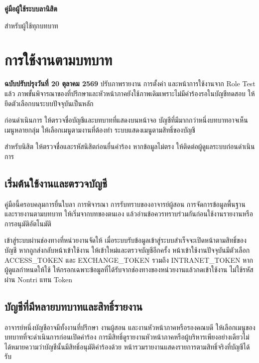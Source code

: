\documentclass[17pt,a4paper]{extreport}
\begin{document}
\begin{titlepage}
  \centering\vspace*{3cm}
  {\Huge\bfseries คู่มือผู้ใช้ระบบลานิสิต\par}
  \vspace{0.8cm}{\Large คณะวิศวกรรมศาสตร์ มหาวิทยาลัยเกษตรศาสตร์\par}
  \vspace{0.4cm}{\large KUKPS Engineering Leave Request\par}
  \vfill{\large สำหรับผู้ใช้ทุกบทบาท\par}\vspace{2cm}
\end{titlepage}
{\small\tableofcontents}\clearpage
\chapter{การใช้งานตามบทบาท}
\textbf{ฉบับปรับปรุงวันที่ 20 ตุลาคม 2569} ปรับภาพรายงาน การตั้งค่า และหน้าการใช้งานจาก Role Test แล้ว ภาพขั้นพิจารณาของที่ปรึกษาและหัวหน้าภาคยังใช้ภาพเดิมเพราะไม่มีคำร้องรอในบัญชีทดสอบ ให้ยึดตัวเลือกบนระบบปัจจุบันเป็นหลัก


ก่อนดำเนินการ ให้ตรวจชื่อบัญชีและบทบาทที่แสดงบนหน้าจอ บัญชีที่มีมากกว่าหนึ่งบทบาทอาจเห็นเมนูหลายกลุ่ม ให้เลือกเมนูตามงานที่ต้องทำ ระบบแสดงเมนูตามสิทธิ์ของบัญชี

สำหรับนิสิต ให้ตรวจชื่อและรหัสนิสิตก่อนยื่นคำร้อง หากข้อมูลไม่ตรง ให้ติดต่อผู้ดูแลระบบก่อนดำเนินการ


\section{เริ่มต้นใช้งานและตรวจบัญชี}
คู่มือนี้ครอบคลุมการยื่นใบลา การพิจารณา การรับทราบของอาจารย์ผู้สอน การจัดการข้อมูลพื้นฐาน และรายงานตามบทบาท ให้เริ่มจากบทของตนเอง แล้วอ่านข้อควรทราบร่วมกันก่อนใช้งานรายงานหรือการอนุมัติอัตโนมัติ

เข้าสู่ระบบผ่านช่องทางที่หน่วยงานจัดให้ เมื่อระบบรับข้อมูลเข้าสู่ระบบสำเร็จจะเปิดหน้าตามสิทธิ์ของบัญชี หากถูกส่งกลับหน้าเข้าใช้งาน ให้เข้าใหม่และตรวจบัญชีอีกครั้ง หน้าเข้าใช้งานปัจจุบันมีตัวเลือก ACCESS\_TOKEN และ EXCHANGE\_TOKEN รวมถึง INTRANET\_TOKEN หากผู้ดูแลกำหนดให้ใช้ ให้กรอกเฉพาะข้อมูลที่ได้รับจากช่องทางของหน่วยงานแล้วกดเข้าใช้งาน ไม่ใช้รหัสผ่าน Nontri แทน Token

\section{บัญชีที่มีหลายบทบาทและสิทธิ์รายงาน}
อาจารย์หนึ่งบัญชีอาจมีทั้งงานที่ปรึกษา งานผู้สอน และงานหัวหน้าภาคหรือรองคณบดี ให้เลือกเมนูของบทบาทที่จะดำเนินการก่อนเปิดคำร้อง การมีสิทธิ์ดูรายงานหัวหน้าภาคหรือผู้บริหารเพียงอย่างเดียวไม่ได้หมายความว่าบัญชีนั้นมีสิทธิ์อนุมัติคำร้องด้วย หน้ารวมรายงานแสดงรายการตามสิทธิ์จริงที่บัญชีได้รับ
\end{document}
